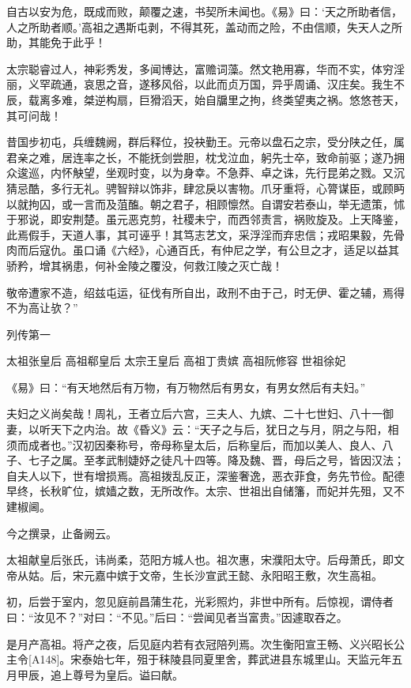 \documentclass[12pt,UTF8]{ctexbook}
\begin{document}
自古以安为危，既成而败，颠覆之速，书契所未闻也。《易》曰：‘天之所助者信，人之所助者顺。’高祖之遇斯屯剥，不得其死，盖动而之险，不由信顺，失天人之所助，其能免于此乎！

太宗聪睿过人，神彩秀发，多闻博达，富赡词藻。然文艳用寡，华而不实，体穷淫丽，义罕疏通，哀思之音，遂移风俗，以此而贞万国，异乎周诵、汉庄矣。我生不辰，载离多难，桀逆构扇，巨猾滔天，始自牖里之拘，终类望夷之祸。悠悠苍天，其可问哉！

昔国步初屯，兵缠魏阙，群后释位，投袂勤王。元帝以盘石之宗，受分陕之任，属君亲之难，居连率之长，不能抚剑尝胆，枕戈泣血，躬先士卒，致命前驱；遂乃拥众逡巡，内怀觖望，坐观时变，以为身幸。不急莽、卓之诛，先行昆弟之戮。又沉猜忌酷，多行无礼。骋智辩以饰非，肆忿戾以害物。爪牙重将，心膂谋臣，或顾眄以就拘囚，或一言而及菹醢。朝之君子，相顾懔然。自谓安若泰山，举无遗策，怵于邪说，即安荆楚。虽元恶克剪，社稷未宁，而西邻责言，祸败旋及。上天降鉴，此焉假手，天道人事，其可诬乎！其笃志艺文，采浮淫而弃忠信；戎昭果毅，先骨肉而后寇仇。虽口诵《六经》，心通百氏，有仲尼之学，有公旦之才，适足以益其骄矜，增其祸患，何补金陵之覆没，何救江陵之灭亡哉！

敬帝遭家不造，绍兹屯运，征伐有所自出，政刑不由于己，时无伊、霍之辅，焉得不为高让欤？”





列传第一

太祖张皇后 高祖郗皇后 太宗王皇后 高祖丁贵嫔 高祖阮修容 世祖徐妃

《易》曰：“有天地然后有万物，有万物然后有男女，有男女然后有夫妇。”

夫妇之义尚矣哉！周礼，王者立后六宫，三夫人、九嫔、二十七世妇、八十一御妻，以听天下之内治。故《昏义》云：“天子之与后，犹日之与月，阴之与阳，相须而成者也。”汉初因秦称号，帝母称皇太后，后称皇后，而加以美人、良人、八子、七子之属。至孝武制婕妤之徒凡十四等。降及魏、晋，母后之号，皆因汉法；自夫人以下，世有增损焉。高祖拨乱反正，深鉴奢逸，恶衣菲食，务先节俭。配德早终，长秋旷位，嫔嫱之数，无所改作。太宗、世祖出自储籓，而妃并先殂，又不建椒阃。

今之撰录，止备阙云。

太祖献皇后张氏，讳尚柔，范阳方城人也。祖次惠，宋濮阳太守。后母萧氏，即文帝从姑。后，宋元嘉中嫔于文帝，生长沙宣武王懿、永阳昭王敷，次生高祖。

初，后尝于室内，忽见庭前昌蒲生花，光彩照灼，非世中所有。后惊视，谓侍者曰：“汝见不？”对曰：“不见。”后曰：“尝闻见者当富贵。”因遽取吞之。

是月产高祖。将产之夜，后见庭内若有衣冠陪列焉。次生衡阳宣王畅、义兴昭长公主令[A148]。宋泰始七年，殂于秣陵县同夏里舍，葬武进县东城里山。天监元年五月甲辰，追上尊号为皇后。谥曰献。
\end{document}
